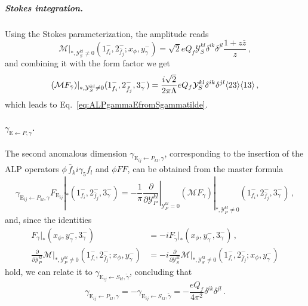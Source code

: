 \subparagraph{Stokes integration.}
Using the Stokes parameterization, the amplitude reads
\begin{equation}
    \mathcal M|_{*,\mathcal Y_S^{kl}\neq 0}(1^-_{f_i},2^-_{\bar f_j};x_\phi,y^-_\gamma) =  \sqrt 2 eQ_f \mathcal Y_S^{kl}\delta^{ik}\delta^{jl} \frac{1+z \bar z}{z} \, ,
\end{equation}
and combining it with the form factor we get
\begin{equation}
    (\mathcal M F_{\tilde\gamma})|_{*,\mathcal Y_S^{kl}\neq 0}(1^-_{f_i},2^-_{\bar f_j},3^-_\gamma)
    =  \frac{ i\sqrt 2}{2\pi\Lambda}  eQ_f \mathcal Y_S^{kl}\delta^{ik}\delta^{jl}  \langle 2 3 \rangle\langle 1 3 \rangle\,,
\end{equation}
which leads to Eq.~\eqref{eq:ALPgammaEfromSgammatilde}.

\paragraph{\texorpdfstring{$\gamma_{\mathrm{E}\leftarrow P,\gamma}$}{gamma E from P, gamma}.}
The second anomalous dimension $\gamma_{\text{E}_{ij}\leftarrow P_{kl},\gamma}$, corresponding
to the insertion of the ALP operators $\phi\, \bar f_k i\gamma_5 f_l$ and $\phi FF$, can be
obtained from the master formula
\begin{equation}
    \gamma_{\text{E}_{ij}\leftarrow P_{kl},\gamma} F_{\text{E}_{ij}}|_*(1^-_{f_i},2^-_{\bar f_j},3^-_\gamma) = -\frac{1}{\pi}\left.\frac{\partial}{\partial \mathcal Y_P^{kl}}\right|_{\mathcal Y_P^{kl}=0}(\mathcal M F_{\gamma})|_{*,\mathcal Y_P^{kl}\neq 0}(1^-_{f_i},2^-_{\bar f_j},3^-_\gamma)\,,
\end{equation}
and, since the identities
\begin{align}
    F_{\gamma}|_*(x_\phi,y^-_\gamma,3_\gamma^-) &= -i F_{\tilde\gamma}|_*(x_\phi,y^-_\gamma,3_\gamma^-) \,,
    \label{eq:ALPF_gamma_identity}\\
    \frac{\partial}{\partial \mathcal Y_P^{kl}}\mathcal M|_{*,\mathcal Y_P^{kl}\neq 0}(1^-_{f_i},2^-_{\bar f_j};x_\phi,y^-_\gamma)&=-i \frac{\partial}{\partial \mathcal Y_S^{kl}} \mathcal M|_{*,\mathcal Y_S^{kl}\neq 0}(1^-_{f_i},2^-_{\bar f_j};x_\phi,y^-_\gamma)\label{eq:ALPamplitudeyukawaidentity}
\end{align}
hold, we can relate it to $\gamma_{\text{E}_{ij}\leftarrow S_{kl},\tilde\gamma}$, concluding
that
\begin{equation}
    \gamma_{\text{E}_{ij}\leftarrow P_{kl},\gamma} = - \gamma_{\text{E}_{ij}\leftarrow S_{kl},\tilde\gamma}= -\frac{eQ_f }{4\pi^2}\delta^{ik}\delta^{jl}\,.
\end{equation}

